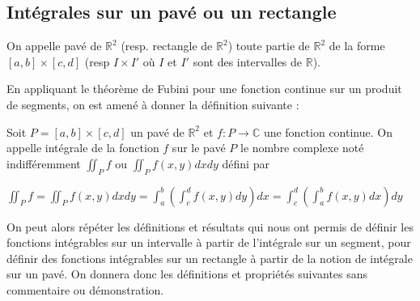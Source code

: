   \subsection{Intégrales sur un pavé ou un rectangle}
  
  \begin{de}
  On appelle pavé de $\mathbb{R}^2$ (resp. rectangle de $\mathbb{R}^2$) toute partie de $\mathbb{R}^2$ de la forme $[a,b] \times [c,d]$ (resp $I \times I'$ où $I$ et $I'$ sont des intervalles de $\mathbb{R}$).
  \end{de}
  
  En appliquant le théorème de Fubini pour une fonction continue sur un produit de segments, on est amené à donner la définition suivante :
  
  \begin{de}
  Soit $P = [a,b] \times [c,d]$ un pavé de $\mathbb{R}^2$ et $f : P \to \mathbb{C}$ une fonction continue. On appelle intégrale de la fonction $f$ sur le pavé $P$ le nombre complexe noté indifféremment $\iint_P f$ ou $\iint_P f(x,y) dx dy$ défini par
  
  $\iint_P f = \iint_P f(x,y) dx dy = \int_a^b \left(\int_c^d f(x,y) dy\right) dx = \int_c^d \left(\int_a^b f(x,y) dx\right) dy$
  \end{de}
  
  On peut alors répéter les définitions et résultats qui nous ont permis de définir les fonctions intégrables sur un intervalle à partir de l'intégrale sur un segment, pour définir des fonctions intégrables sur un rectangle à partir de la notion de intégrale sur un pavé. On donnera donc les définitions et propriétés suivantes sans commentaire ou démonstration.
  
